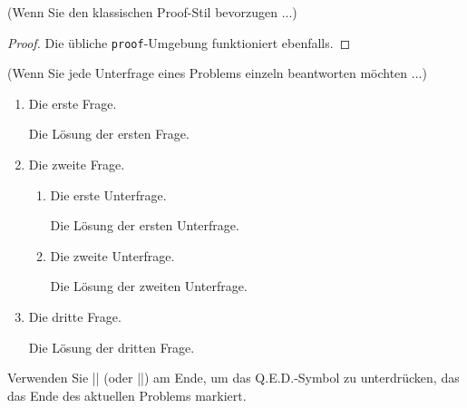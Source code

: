 \documentclass[11pt,
  logo = {example-image},
  title in boldface,
  theorem in new line,
  colored solution,
]{homework}
\begin{document}
\enlargethispage{.5\baselineskip}
\bigskip\textcolor{gray!55}{(Wenn Sie den klassischen Proof-Stil bevorzugen ...)}

\begin{proof}
    Die übliche \verb|proof|-Umgebung funktioniert ebenfalls.
\end{proof}


\bigskip\textcolor{gray!55}{(Wenn Sie jede Unterfrage eines Problems einzeln beantworten möchten ...)}

\begin{problem}
    \begin{enumerate}
        \item Die erste Frage.

        \begin{solution}
            Die Lösung der ersten Frage.
        \end{solution}

        \item Die zweite Frage.

        \begin{enumerate}
            \item Die erste Unterfrage.

            \begin{solution}
                Die Lösung der ersten Unterfrage.
            \end{solution}

            \item Die zweite Unterfrage.

            \begin{solution}
                Die Lösung der zweiten Unterfrage.
            \end{solution}

        \end{enumerate}

        \item Die dritte Frage.

        \begin{solution}
            Die Lösung der dritten Frage.
        \end{solution}

    \end{enumerate}
    Verwenden Sie \cverb|\noqed| (oder \cverb|\noQED|) am Ende, um das Q.E.D.-Symbol zu unterdrücken, das das Ende des aktuellen Problems markiert.
    \noQED
\end{problem}
\end{document}
